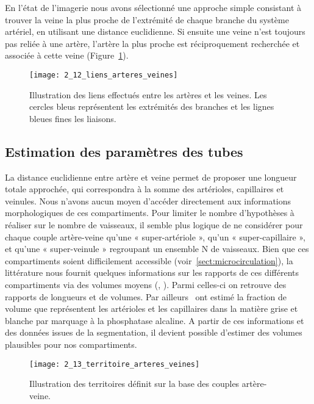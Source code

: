 En l’état de l’imagerie nous avons sélectionné une approche simple consistant à trouver la veine la plus proche de l’extrémité de chaque branche du système artériel, en utilisant une distance euclidienne. Si ensuite une veine n’est toujours pas reliée à une artère, l’artère la plus proche est réciproquement recherchée et associée à cette veine (Figure~\ref{fig:2_12_liens_arteres_veines}).
\begin{figure}[!t]
\centering
\texttt{[image: 2\_12\_liens\_arteres\_veines]}
\caption{Illustration des liens effectués entre les artères et les veines. Les cercles bleus représentent les extrémités des branches et les lignes bleues fines les liaisons.}
\label{fig:2_12_liens_arteres_veines}	
\end{figure}	
\subsection{Estimation des paramètres des tubes}
\label{sec:tubesestimates}
La distance euclidienne entre artère et veine permet de proposer une longueur totale approchée, qui correspondra à la somme des artérioles, capillaires et veinules.  Nous n’avons aucun moyen d’accéder directement aux informations morphologiques de ces compartiments. Pour limiter le nombre d’hypothèses à réaliser sur le nombre de vaisseaux, il semble plus logique de ne considérer pour chaque couple artère-veine qu’une « super-artériole », qu’un « super-capillaire », et qu’une « super-veinule » regroupant un ensemble N de vaisseaux. Bien que ces compartiments soient difficilement accessible (voir~\ref{sect:microcirculation}), la littérature nous fournit quelques informations sur les rapports de ces différents compartiments via des volumes moyens (\cite{Zagzoule1986}, \cite{Linninger2009}). Parmi celles-ci on retrouve des rapports de longueurs et de volumes. Par ailleurs~\cite{Moody2004} ont estimé la fraction de volume que représentent les artérioles et les capillaires dans la matière grise et blanche par marquage à la phosphatase alcaline. A partir de ces informations et des données issues de la segmentation, il devient possible d’estimer des volumes plausibles pour nos compartiments.\\	
\begin{figure}[!b]
\centering
\texttt{[image: 2\_13\_territoire\_arteres\_veines]}
\caption{Illustration des territoires définit sur la base des couples artère-veine.}
\label{fig:2_13_territoire_arteres_veines}	
\end{figure}	
